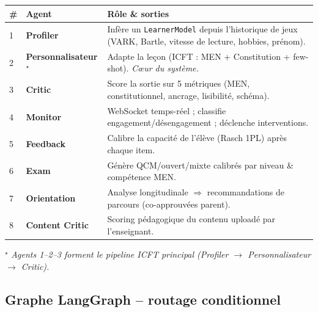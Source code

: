\documentclass[11pt,a4paper]{article}
\begin{document}
\begin{center}
\small
\begin{tabular}{@{}p{0.4cm}p{3.6cm}p{10.8cm}@{}}
\toprule
\# & \textbf{Agent} & \textbf{Rôle \& sorties} \\
\midrule
1 & \textbf{Profiler}              & Infère un \texttt{LearnerModel} depuis l'historique de jeux (VARK, Bartle, vitesse de lecture, hobbies, prénom).\\
2 & \textbf{Personnalisateur}$^{\star}$ & Adapte la leçon (ICFT : MEN + Constitution + few-shot). \textit{Cœur du système.}\\
3 & \textbf{Critic}                & Score la sortie sur 5 métriques (MEN, constitutionnel, ancrage, lisibilité, schéma).\\
4 & \textbf{Monitor}               & WebSocket temps-réel ; classifie engagement/désengagement ; déclenche interventions.\\
5 & \textbf{Feedback}              & Calibre la capacité de l'élève (Rasch 1PL) après chaque item.\\
6 & \textbf{Exam}                  & Génère QCM/ouvert/mixte calibrés par niveau \& compétence MEN.\\
7 & \textbf{Orientation}           & Analyse longitudinale $\Rightarrow$ recommandations de parcours (co-approuvées parent).\\
8 & \textbf{Content Critic}        & Scoring pédagogique du contenu uploadé par l'enseignant.\\
\bottomrule
\end{tabular}
\end{center}
\vspace{0.3em}
{\footnotesize$^{\star}$ \textit{Agents 1--2--3 forment le pipeline ICFT principal (Profiler $\rightarrow$ Personnalisateur $\rightarrow$ Critic).}}

\subsection{Graphe LangGraph -- routage conditionnel}
\end{document}
